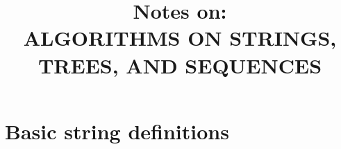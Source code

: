 \documentclass[12pt]{article}
\title{Notes on:\\ALGORITHMS ON STRINGS, TREES, AND SEQUENCES}
\author{}
\date{} %
\begin{document}
\maketitle

\newpage

\section{Basic string definitions}

\end{document}
